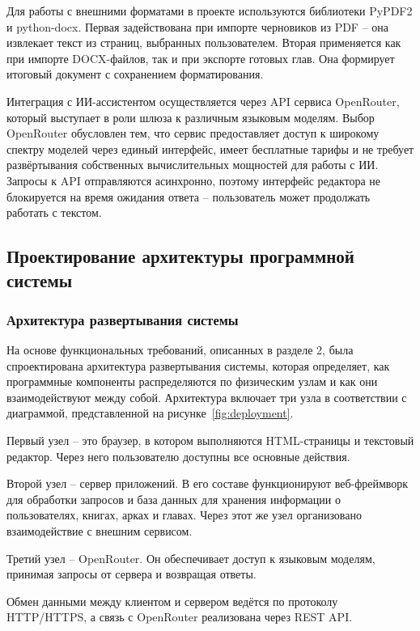 Для работы с внешними форматами в проекте используются библиотеки PyPDF2 и python-docx. Первая задействована при импорте черновиков из PDF -- она извлекает текст из страниц, выбранных пользователем. Вторая применяется как при импорте DOCX-файлов, так и при экспорте готовых глав. Она формирует итоговый документ с сохранением форматирования.

Интеграция с ИИ-ассистентом осуществляется через API сервиса OpenRouter, который выступает в роли шлюза к различным языковым моделям. Выбор OpenRouter обусловлен тем, что сервис предоставляет доступ к широкому спектру моделей через единый интерфейс, имеет бесплатные тарифы и не требует развёртывания собственных вычислительных мощностей для работы с ИИ. Запросы к API отправляются асинхронно, поэтому интерфейс редактора не блокируется на время ожидания ответа -- пользователь может продолжать работать с текстом.

\subsection{Проектирование архитектуры программной системы}

\subsubsection{Архитектура развертывания системы}

На основе функциональных требований, описанных в разделе 2, была спроектирована архитектура развертывания системы, которая определяет, как программные компоненты распределяются по физическим узлам и как они взаимодействуют между собой. Архитектура включает три узла в соответствии с диаграммой, представленной на рисунке~\ref{fig:deployment}.

Первый узел -- это браузер, в котором выполняются HTML-страницы и текстовый редактор. Через него пользователю доступны все основные действия.

Второй узел -- сервер приложений. В его составе функционируют веб-фреймворк для обработки запросов и база данных для хранения информации о пользователях, книгах, арках и главах. Через этот же узел организовано взаимодействие с внешним сервисом.

Третий узел -- OpenRouter. Он обеспечивает доступ к языковым моделям, принимая запросы от сервера и возвращая ответы.

Обмен данными между клиентом и сервером ведётся по протоколу HTTP/HTTPS, а связь с OpenRouter реализована через REST API.

